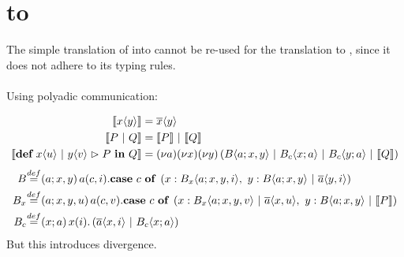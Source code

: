 \section{\MonadicJoinCalc to \ActorPiCalc}

The simple translation of \joincalc into \asyncpicalc \cite{fournet_reflexive_1996} cannot be re-used for the translation to \actorpicalc,
since it does not adhere to its typing rules.
\\
\\
Using polyadic communication:

\begin{align}
  \begin{split}
    \encMJtoAP{\jsnd{x}{y}}
    &= \asnd{x}{y} \\
    \encMJtoAP{P \jpar Q}
    &= \encMJtoAP{P} \apar \encMJtoAP{Q} \\
    \encMJtoAP{\jdef{\jrct{\jrcv{x}{u} \jpat \jrcv{y}{v}}{P}}{Q}}
    &= \anew{a}{\anew{x}{\anew*{y}{ \ains{B}{a}{x,y} \apar \ains{B_c}{x}{a} \apar \ains{B_c}{y}{a} \apar \encMJtoAP{Q}}}} \\
  \end{split}
\end{align}
\begin{align}
  \adef*{B}{a}{x,y}{
    \arcv{a}{c,i} . \acse{c}{
       \aalt{x}{\ains{B_x}{a}{x,y,i}},\ 
       \aalt{y}{\ains{B}{a}{x,y} \apar \asnd{a}{y,i}}
     }
  } \\
  \adef*{B_x}{a}{x,y,u}{
    \arcv{a}{c,v} . \acse{c}{
      \aalt{x}{\ains{B_x}{a}{x,y,v} \apar \asnd{a}{x,u}},\ 
      \aalt{y}{\ains{B}{a}{x,y} \apar \encMJtoAP{P}}
    } \\
  }
  \adef*{B_c}{x}{a}{
    \arcv{x}{i} . \parens{\asnd{a}{x,i} \apar \ains{B_c}{x}{a}}
  }
\end{align}
But this introduces divergence.
